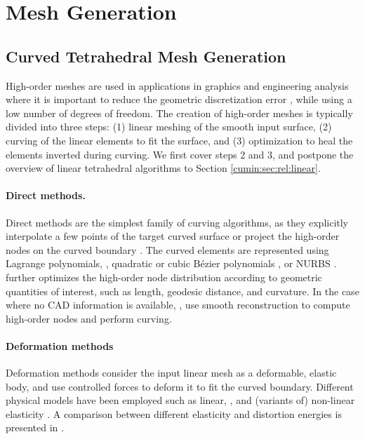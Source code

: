 \section{Mesh Generation}\label{cumin:sec:related}

\subsection{Curved Tetrahedral Mesh Generation}

High-order meshes are used in applications in graphics \cite{bargteil2014animation,MEZGER2009680,Suwelack2013} and engineering analysis \cite{Jameson2002} where it is important to reduce the geometric discretization error \cite{Babuska1988,BABUSKA1992159,BASSI1997251,luo2001influence,ODEN1994309}, while using a low number of degrees of freedom. The creation of high-order meshes is typically divided into three steps: (1) linear meshing of the smooth input surface, (2) curving of the linear elements to fit the surface, and (3) optimization to heal the elements inverted during curving. We first cover steps 2 and 3, and postpone the overview of linear tetrahedral algorithms to Section \ref{cumin:sec:rel:linear}.

\paragraph{Direct methods.} Direct methods are the simplest family of curving algorithms, as they explicitly interpolate a few points of the target curved surface or project the high-order nodes on the curved boundary  \cite{dey1999curvilinear,Ghasemi2016,MOXEY2015636,abgrall2012,sherwin2002mesh,turner2017high,marcon2019semi}. The curved elements are represented using Lagrange polynomials, \cite{dey1999curvilinear,Peir2008}, quadratic or cubic B{\'e}zier polynomials \cite{George2012,Qiukai2013,Luo2002pVersionMG}, or NURBS \cite{ENGVALL2016378,ENGVALL201783}. \cite{SHEPHARD2005251,sherwin2002mesh} further optimizes the high-order node distribution according to geometric quantities of interest, such as length, geodesic distance, and curvature. 
In the case where no CAD information is available, \cite{wang2016construction}, \cite{jiao2012reconstructing} use smooth reconstruction to compute high-order nodes and perform curving.

\paragraph{Deformation methods} Deformation methods consider the input linear mesh as a deformable, elastic body, and use controlled forces to deform it to fit the curved boundary. Different physical models have been employed such as linear, \cite{Abgrall2014,abgrall2012,dobrzynski2017,Xie2013}, and (variants of) non-linear elasticity \cite{Persson2009,MOXEY2016130,FORTUNATO20161}. A comparison between different elasticity and distortion energies is presented in \cite{Poya2016, TURNER2016340, dobrev2019target}.

